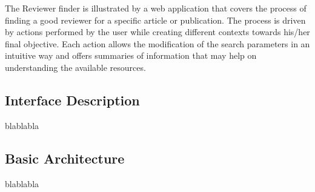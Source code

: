 The Reviewer finder is illustrated by a web application that covers the process of finding a good reviewer for a specific article or publication. The process is driven by actions performed by the user while creating different contexts towards his/her final objective. Each action allows the modification of the search parameters in an intuitive way and offers summaries of information that may help on understanding the available resources.\\
\subsection{Interface Description}
blablabla
\subsection{Basic Architecture}
blablabla
